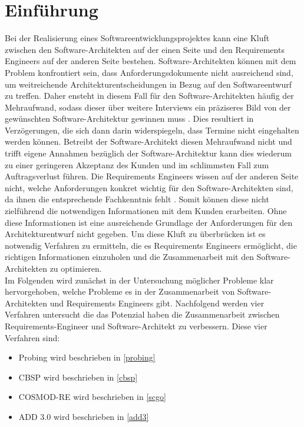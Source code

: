 \section{Einf\"uhrung}
Bei der Realisierung eines Softwareentwicklungsprojektes kann eine Kluft zwischen den Software-Architekten auf der einen Seite und den Requirements Engineers auf der anderen Seite bestehen. Software-Architekten k\"onnen mit dem Problem konfrontiert sein, dass Anforderungsdokumente nicht ausreichend sind, um weitreichende Architekturentscheidungen in Bezug auf den Softwareentwurf zu treffen. Daher ensteht in diesem Fall f\"ur den Software-Architekten h\"aufig der Mehraufwand, sodass dieser \"uber weitere Interviews ein pr\"aziseres Bild von der gew\"unschten Software-Architektur gewinnen muss \cite{Ros01}. Dies resultiert in Verz\"ogerungen, die sich dann darin widerspiegeln, dass Termine nicht eingehalten werden k\"onnen. Betreibt der Software-Architekt diesen Mehraufwand nicht und trifft eigene Annahmen bez\"uglich der Software-Architektur \cite{Ros01} kann dies wiederum zu einer geringeren Akzeptanz des Kunden und im schlimmsten Fall zum Auftragsverlust f\"uhren. Die Requirements Engineers wissen auf der anderen Seite nicht, welche Anforderungen konkret wichtig f\"ur den Software-Architekten sind, da ihnen die entsprechende Fachkenntnis fehlt \cite{Ros01}. Somit k\"onnen diese nicht zielf\"uhrend die notwendigen Informationen mit dem Kunden erarbeiten. Ohne diese Informationen ist eine ausreichende Grundlage der Anforderungen f\"ur den Architekturentwurf nicht gegeben. Um diese Kluft zu \"uberbr\"ucken ist es notwendig Verfahren zu ermitteln, die es Requirements Engineers erm\"oglicht, die richtigen Informationen einzuholen und die Zusammenarbeit mit den Software-Architekten zu optimieren.\\

Im Folgenden wird zun\"achst in der Untersuchung m\"oglicher Probleme klar hervorgehoben, welche Probleme es in der Zusammenarbeit von Software-Architekten und Requirements Engineers gibt. Nachfolgend werden vier Verfahren untersucht die das Potenzial haben die Zusammenarbeit zwischen Requirements-Engineer und Software-Architekt zu verbessern. Diese vier Verfahren sind:\\

\begin{itemize}
\item Probing wird beschrieben in \ref{probing}
\item CBSP wird beschrieben in \ref{cbsp}
\item COSMOD-RE wird beschrieben in \ref{scgo}
\item ADD 3.0 wird beschrieben in \ref{add3}\\
\end{itemize}

